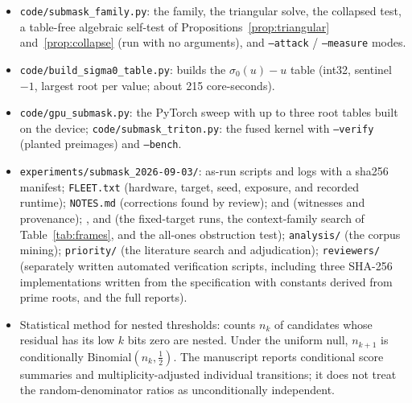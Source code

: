 \documentclass[11pt,a4paper]{article}
\newcommand{\sig}[1]{\sigma_{#1}}
\begin{document}
\begin{itemize}
\item \texttt{code/submask\_family.py}: the family, the triangular solve, the
  collapsed test, a table-free algebraic self-test of
  Propositions~\ref{prop:triangular} and~\ref{prop:collapse} (run with no
  arguments), and \texttt{--attack} / \texttt{--measure} modes.
\item \texttt{code/build\_sigma0\_table.py}: builds the $\sig0(u)-u$ table
  (int32, sentinel $-1$, largest root per value; about 215 core-seconds).
\item \texttt{code/gpu\_submask.py}: the PyTorch sweep with up to three root
  tables built on the device; \texttt{code/submask\_triton.py}: the fused
  kernel with \texttt{--verify} (planted preimages) and \texttt{--bench}.
\item \texttt{experiments/submask\_2026-09-03/}: as-run scripts and logs with a
  sha256 manifest; \texttt{FLEET.txt} (hardware, target, seed, exposure,
  and recorded runtime); \texttt{NOTES.md} (corrections found by review);
   and  (witnesses and
  provenance); ,  and
   (the fixed-target runs, the context-family
  search of Table~\ref{tab:frames}, and the all-ones obstruction test);
  \texttt{analysis/} (the corpus mining);
  \texttt{priority/} (the literature search and adjudication);
  \texttt{reviewers/} (separately written automated verification scripts,
  including three SHA-256 implementations written from the specification with
  constants derived from prime roots, and the full reports).
\item Statistical method for nested thresholds: counts $n_k$ of candidates
  whose residual has its low $k$ bits zero are nested.  Under the uniform null,
  $n_{k+1}$ is conditionally Binomial$(n_k,\tfrac12)$.  The manuscript reports
  conditional score summaries and multiplicity-adjusted individual
  transitions; it does not treat the random-denominator ratios as
  unconditionally independent.
\end{itemize}
\end{document}
